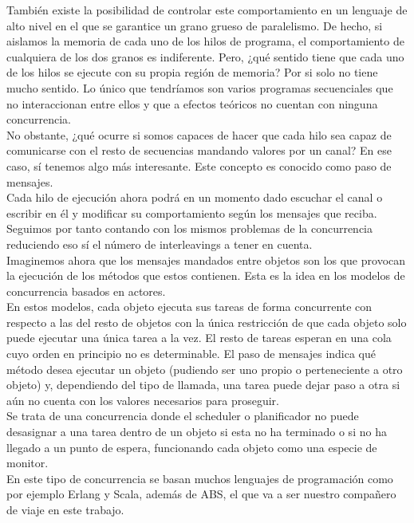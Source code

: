 También existe la posibilidad de controlar este comportamiento en un lenguaje de alto nivel en el que se garantice un grano grueso de paralelismo. De hecho, si aislamos la memoria de cada uno de los hilos de programa, el comportamiento de cualquiera de los dos granos es indiferente. Pero, ¿qué sentido tiene que cada uno de los hilos se ejecute con su propia región de memoria? Por si solo no tiene mucho sentido. Lo único que tendríamos son varios programas secuenciales que no interaccionan entre ellos y que a efectos teóricos no cuentan con ninguna concurrencia.\\

No obstante, ¿qué ocurre si somos capaces de hacer que cada hilo sea capaz de comunicarse con el resto de secuencias mandando valores por un canal? En ese caso, sí tenemos algo más interesante. Este concepto es conocido como paso de mensajes.\\

Cada hilo de ejecución ahora podrá en un momento dado escuchar el canal o escribir en él y modificar su comportamiento según los mensajes que reciba. Seguimos por tanto contando con los mismos problemas de la concurrencia reduciendo eso sí el número de interleavings a tener en cuenta.\\

Imaginemos ahora que los mensajes mandados entre objetos son los que provocan la ejecución de los métodos que estos contienen. Esta es la idea en los modelos de concurrencia basados en actores.\\

En estos modelos, cada objeto ejecuta sus tareas de forma concurrente con respecto a las del resto de objetos con la única restricción de que cada objeto solo puede ejecutar una única tarea a la vez. El resto de tareas esperan en una cola cuyo orden en principio no es determinable. El paso de mensajes indica qué método desea ejecutar un objeto (pudiendo ser uno propio o perteneciente a otro objeto) y, dependiendo del tipo de llamada, una tarea puede dejar paso a otra si aún no cuenta con los valores necesarios para proseguir.\\

Se trata de una concurrencia donde el scheduler o planificador no puede desasignar a una tarea dentro de un objeto si esta no ha terminado o si no ha llegado a un punto de espera, funcionando cada objeto como una especie de monitor.\\

En este tipo de concurrencia se basan muchos lenguajes de programación como por ejemplo Erlang y Scala, además de ABS, el que va a ser nuestro compañero de viaje en este trabajo.\\


